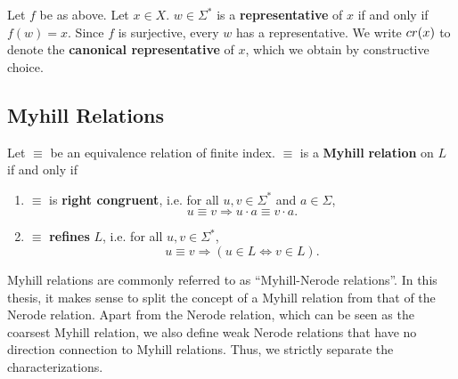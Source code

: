
\begin{definition}
    Let $f$ be as above. 
    Let $x \in X$. $w \in \Sigma^*$ is a \textbf{representative} of $x$ if and only if $f(w) = x$.
    Since $f$ is surjective, every $w$ has a representative. 
    We write $cr(x)$ to denote the \textbf{canonical representative} of $x$, which we obtain by constructive choice.
\end{definition}




\subsection{Myhill Relations}

\begin{definition} 
    \label{Myhill}
    Let $\equiv$ be an equivalence relation of finite index. $\equiv$ is a \textbf{Myhill}%
    \textbf{relation} \cite{DBLP:books/daglib/0088160} on $L$ if and only if

\begin{enumerate}[label=(\roman*)]

    \item\label{right_congruent}
        $\equiv$ is \textbf{right congruent}, i.e. for all $u, v \in \Sigma^*$ and $a \in \Sigma$,
        \begin{equation*}
            u \equiv v \Rightarrow
            u \cdot a \equiv v \cdot a.
        \end{equation*}


    \item\label{refinement}
        $\equiv$ \textbf{refines} $L$, i.e. for all $u,v \in \Sigma^*$,
        \begin{equation*}
            u \equiv v \Rightarrow
            (u \in L \iff v \in L).
        \end{equation*}

\end{enumerate}
\end{definition}

Myhill relations are commonly referred to as ``Myhill-Nerode relations''. 
In this thesis, it makes sense to split the concept of a Myhill relation from that of the Nerode relation.
Apart from the Nerode relation, which can be seen as the coarsest Myhill relation, we also define
weak Nerode relations that have no direction connection to Myhill relations.
Thus, we strictly separate the characterizations.

